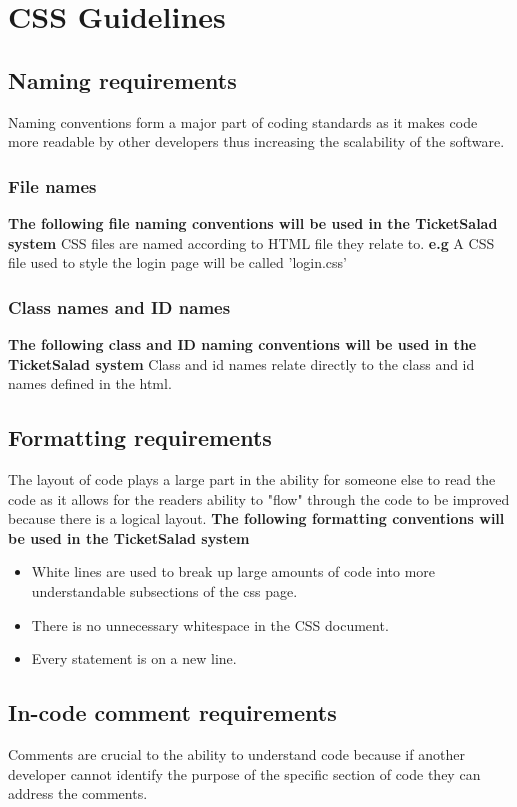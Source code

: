 \documentclass[11pt]{article}
\begin{document}
	\section{CSS Guidelines}
	\subsection{Naming requirements}
	Naming conventions form a major part of coding standards as it makes code more readable by other developers thus increasing the scalability of the software.
	\subsubsection{File names}
	\textbf{The following file naming conventions will be used in the TicketSalad system}
	\newline
	CSS files are named according to HTML file they relate to. \textbf{e.g} A CSS file used to style the login page will be called 'login.css'
	\subsubsection{Class names and ID names}
	\textbf{The following class and ID naming conventions will be used in the TicketSalad system}
	Class and id names relate directly to the class and id names defined in the html.
	\subsection{Formatting requirements}
	The layout of code plays a large part in the ability for someone else to read the code as it allows for the readers ability to "flow" through the code to be improved because there is a logical layout.
	\newline
	\textbf{The following formatting conventions will be used in the TicketSalad system}
	\begin{itemize}
		\item White lines are used to break up large amounts of code into more understandable subsections of the css page.
		\item There is no unnecessary whitespace in the CSS document.
		\item Every statement is on a new line.
	\end{itemize}
	\subsection{In-code comment requirements}
	Comments are crucial to the ability to understand code because if another developer cannot identify the purpose of the specific section of code they can address the comments.
	
\end{document}
